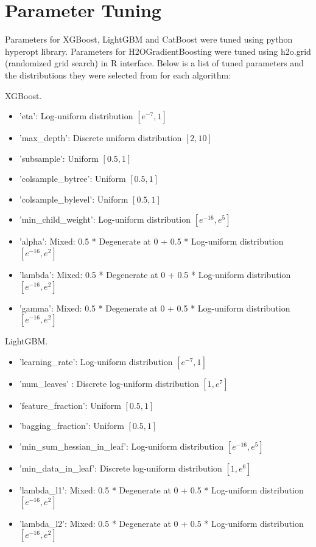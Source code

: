 \documentclass{article}
\begin{document}
\section{Parameter Tuning}
Parameters for XGBoost, LightGBM and CatBoost were tuned using python hyperopt library. Parameters for H2OGradientBoosting were tuned using h2o.grid (randomized grid search) in R interface. Below is a list of tuned parameters and the distributions they were selected from for each algorithm:

\medskip
\noindent XGBoost.
\begin{itemize}
  \item 'eta': Log-uniform distribution $[e^{-7}, 1]$
  \item 'max\_depth': Discrete uniform distribution $[2, 10]$
  \item 'subsample': Uniform $[0.5, 1]$
  \item 'colsample\_bytree': Uniform $[0.5, 1]$
  \item 'colsample\_bylevel': Uniform $[0.5, 1]$
  \item 'min\_child\_weight': Log-uniform distribution $[e^{-16}, e^{5}]$
  \item 'alpha': Mixed: 0.5 * Degenerate at 0 + 0.5 * Log-uniform distribution $[e^{-16}, e^{2}]$
  \item 'lambda': Mixed: 0.5 * Degenerate at 0 + 0.5 * Log-uniform distribution $[e^{-16}, e^{2}]$
  \item 'gamma': Mixed: 0.5 * Degenerate at 0 + 0.5 * Log-uniform distribution $[e^{-16}, e^{2}]$
\end{itemize}

\medskip
\noindent LightGBM.
\begin{itemize}
  \item 'learning\_rate': Log-uniform distribution $[e^{-7}, 1]$
  \item 'num\_leaves' : Discrete log-uniform distribution $[1, e^{7}]$
  \item 'feature\_fraction': Uniform $[0.5, 1]$
  \item 'bagging\_fraction': Uniform $[0.5, 1]$
  \item 'min\_sum\_hessian\_in\_leaf': Log-uniform distribution $[e^{-16}, e^{5}]$
  \item 'min\_data\_in\_leaf':  Discrete log-uniform distribution $[1, e^{6}]$
  \item 'lambda\_l1': Mixed: 0.5 * Degenerate at 0 + 0.5 * Log-uniform distribution $[e^{-16}, e^{2}]$
  \item 'lambda\_l2': Mixed: 0.5 * Degenerate at 0 + 0.5 * Log-uniform distribution $[e^{-16}, e^{2}]$
\end{itemize}
\end{document}
